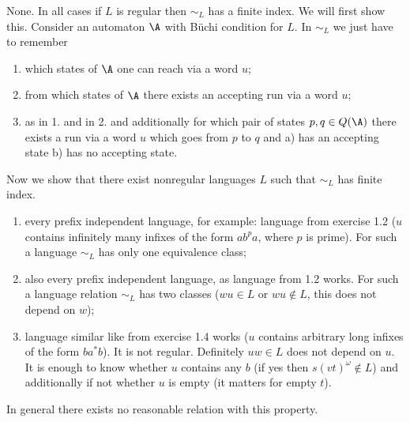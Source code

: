 {None. In all cases if $L$ is regular then $\sim_L$ has a finite index.
We will first show this. Consider an automaton $\A$ with B\"{u}chi condition for $L$.
In $\sim_L$ we just have to remember
\begin{enumerate}
  \item which states of $\A$ one can reach via a word $u$;
  \item from which states of $\A$ there exists an accepting run via a word $u$;
  \item as in 1. and in 2. and additionally for which pair of states $p, q \in Q(\A)$ there exists a run via a word $u$
  which goes from $p$ to $q$ and a) has an accepting state b) has no accepting state.
\end{enumerate}
Now we show that there exist nonregular languages $L$ such that $\sim_L$ has finite index.
\begin{enumerate}
  \item every prefix independent language, for example: language from exercise 1.2
  ($u$ contains infinitely many infixes of the form
  $ab^pa$, where $p$ is prime). For such a language $\sim_L$ has only one equivalence class;
  \item also every prefix independent language, as language from 1.2 works. For such a language
  relation $\sim_L$ has two classes ($wu \in L$ or $wu \not\in L$, this does not depend on $w$);
  \item language similar like from exercise 1.4 works ($u$ contains arbitrary long infixes of the form $ba^*b$).
  It is not regular. Definitely $uw \in L$ does not depend on $u$. It is enough to know whether $u$ contains any $b$
  (if yes then $s (v t)^\omega \not \in L$) and additionally if not whether $u$ is empty (it matters for empty $t$).
\end{enumerate}
In general there exists no reasonable relation with this property.
}



